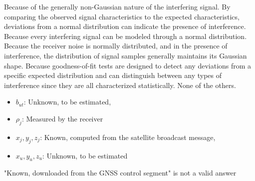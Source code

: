 \begin{checkboxes}
    \CorrectChoice Because of the generally non-Gaussian nature of the interfering signal. By comparing the observed signal characteristics to the expected characteristics, deviations from a normal distribution can indicate the presence of interference.
    \choice Because every interfering signal can be modeled through a normal distribution.
    \choice Because the receiver noise is normally distributed, and in the presence of interference, the distribution of signal samples generally maintains its Gaussian shape.
    \choice Because goodness-of-fit tests are designed to detect any deviations from a specific expected distribution and can distinguish between any types of interference since they are all characterized statistically.
    \choice None of the others.
\end{checkboxes}

\begin{solution}
    \begin{itemize}
        \item \textbf{$b_{ut}$}: Unknown, to be estimated,
        \item \textbf{$\rho_j$}: Measured by the receiver
        \item \textbf{$x_j, y_j, z_j$}: Known, computed from the satellite broadcast message,
        \item \textbf{$x_u, y_u, z_u$}: Unknown, to be estimated
    \end{itemize}
    "Known, downloaded from the GNSS control segment" is not a valid answer
\end{solution}
